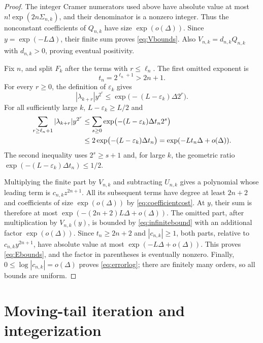 \documentclass{amsart}
\numberwithin{equation}{section}
\begin{document}
\begin{proof}
The integer Cramer numerators used above have absolute value at most
$n!\exp(2n\Sigma_{n,k})$, and their denominator is a nonzero
integer. Thus the nonconstant coefficients of $Q_{n,k}$ have size
$\exp(o(\Delta))$. Since $y=\exp(-L\Delta)$, their finite sum
proves \eqref{eq:Vbounds}. Also $V_{n,k}=d_{n,k}Q_{n,k}$ with
$d_{n,k}>0$, proving eventual positivity.

Fix $n$, and split $F_k$ after the terms with $r\le\ell_n$.
The first omitted exponent is
\[
t_n=2^{\ell_n+1}>2n+1.
\]
For every $r\ge0$, the definition of $\varepsilon_k$ gives
\[
|\lambda_{k+r}|y^{2^r}
 \le\exp\bigl(-(L-\varepsilon_k)\Delta2^r\bigr).
\]
For all sufficiently large $k$, $L-\varepsilon_k\ge L/2$ and
\begin{align}
\sum_{r\ge\ell_n+1}|\lambda_{k+r}|y^{2^r}
&\le\sum_{s\ge0}\exp\bigl(-(L-\varepsilon_k)\Delta t_n2^s\bigr)
 \notag\\
&\le2\exp\bigl(-(L-\varepsilon_k)\Delta t_n\bigr)
 =\exp(-Lt_n\Delta+o(\Delta)).\label{eq:infinitebound}
\end{align}
The second inequality uses $2^s\ge s+1$ and, for large $k$, the
geometric ratio $\exp(-(L-\varepsilon_k)\Delta t_n)\le1/2$.

Multiplying the finite part by $V_{n,k}$ and subtracting
$U_{n,k}$ gives a polynomial whose leading term is
$c_{n,k}z^{2n+1}$. All its subsequent terms have degree at least
$2n+2$ and coefficients of size $\exp(o(\Delta))$ by
\eqref{eq:coefficientcost}. At $y$, their sum is therefore at most
$\exp(-(2n+2)L\Delta+o(\Delta))$.
The omitted part, after multiplication by $V_{n,k}(y)$, is bounded
by \eqref{eq:infinitebound} with an additional factor
$\exp(o(\Delta))$. Since $t_n\ge2n+2$ and $|c_{n,k}|\ge1$,
both parts, relative to $c_{n,k}y^{2n+1}$, have absolute value at
most $\exp(-L\Delta+o(\Delta))$.
This proves \eqref{eq:Ebounds}, and the factor in parentheses is
eventually nonzero. Finally, $0\le\log|c_{n,k}|=o(\Delta)$ proves
\eqref{eq:errorlog}; there are finitely many orders, so all bounds
are uniform.
\end{proof}

\section{Moving-tail iteration and integerization}
\end{document}
